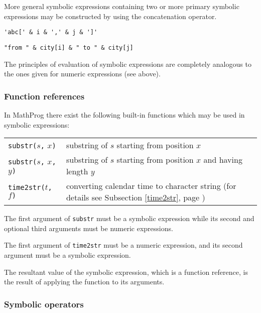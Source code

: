 \documentclass[10pt]{article}
\begin{document}
\medskip

More general symbolic expressions containing two or more primary
symbolic expressions may be constructed by using the concatenation
operator.

\medskip


\medskip

\noindent\verb|'abc[' & i & ',' & j & ']'|

\noindent\verb|"from " & city[i] & " to " & city[j]|

\medskip

The principles of evaluation of symbolic expressions are completely
analogous to the ones given for numeric expressions (see above).

\subsubsection{Function references}

In MathProg there exist the following built-in functions which may be
used in symbolic expressions:

\medskip

\begin{tabular}{@{}p{96pt}p{222pt}@{}}
{\tt substr(}$s${\tt,} $x${\tt)}&substring of $s$ starting from
position $x$\\
{\tt substr(}$s${\tt,} $x${\tt,} $y${\tt)}&substring of $s$ starting
from position $x$ and having length $y$\\
{\tt time2str(}$t${\tt,} $f${\tt)}&converting calendar time to
character string (for details see Subsection \ref{time2str}, page
\pageref{time2str})\\
\end{tabular}

\medskip

The first argument of {\tt substr} must be a symbolic expression while
its second and optional third arguments must be numeric expressions.

The first argument of {\tt time2str} must be a numeric expression, and
its second argument must be a symbolic expression.

The resultant value of the symbolic expression, which is a function
reference, is the result of applying the function to its arguments.

\subsubsection{Symbolic operators}
\end{document}
